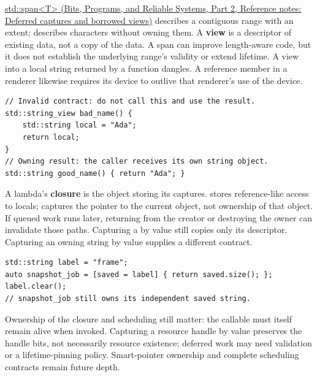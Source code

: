 \hypertarget{05-engine-i-ch003-borrowed-views-and-deferred-work-need-an-owner-story}{}

\href{../01-Bits-Programs-and-Reliable-Systems-P02/main.pdf\#nameddest=appendix-aea529eb5175}{std::span\textless T\textgreater{} (Bits, Programs, and Reliable Systems, Part 2, Reference notes: Deferred captures and borrowed views)} describes a contiguous range with an extent;  describes characters without owning them. A \textbf{view} is a descriptor of existing data, not a copy of the data. A span can improve length-aware code, but it does not establish the underlying range's validity or extend lifetime. A view into a local string returned by a function dangles. A reference member in a renderer likewise requires its device to outlive that renderer's use of the device.

\begin{verbatim}
// Invalid contract: do not call this and use the result.
std::string_view bad_name() {
    std::string local = "Ada";
    return local;
}
// Owning result: the caller receives its own string object.
std::string good_name() { return "Ada"; }
\end{verbatim}

A lambda's \textbf{closure} is the object storing its captures. \BookInlineCode{{{[}}{\&}{{]}}}{{[}\&{]}} stores reference-like access to locals; \BookInlineCode{{{[}}{t}{h}{i}{s}{{]}}}{{[}this{]}} captures the pointer to the current object, not ownership of that object. If queued work runs later, returning from the creator or destroying the owner can invalidate those paths. Capturing a  by value still copies only its descriptor. Capturing an owning string by value supplies a different contract.

\begin{verbatim}
std::string label = "frame";
auto snapshot_job = [saved = label] { return saved.size(); };
label.clear();
// snapshot_job still owns its independent saved string.
\end{verbatim}

Ownership of the closure and scheduling still matter: the callable must itself remain alive when invoked. Capturing a resource handle by value preserves the handle bits, not necessarily resource existence; deferred work may need validation or a lifetime-pinning policy. Smart-pointer ownership and complete scheduling contracts remain future depth.

